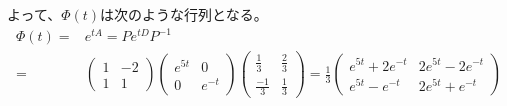 \documentclass[12pt,b5paper]{ltjsarticle}
\begin{document}
\begin{enumerate}
      よって、$\Phi(t)$は次のような行列となる。
      \begin{align}
       \Phi(t) =& e^{tA} = Pe^{tD}P^{-1}\\
        =&
        \begin{pmatrix} 1 & -2 \\ 1 & 1 \end{pmatrix}
        \begin{pmatrix} e^{5t} & 0 \\ 0 & e^{-t} \end{pmatrix}
       \begin{pmatrix}
        \frac{1}{3} & \frac{2}{3} \\
        \frac{-1}{3} & \frac{1}{3}
       \end{pmatrix}
       =
       \frac{1}{3}
       \begin{pmatrix} e^{5t}+2e^{-t} & 2e^{5t}-2e^{-t} \\ e^{5t}-e^{-t} & 2e^{5t}+e^{-t} \end{pmatrix}
      \end{align}


\end{enumerate}
\end{document}
